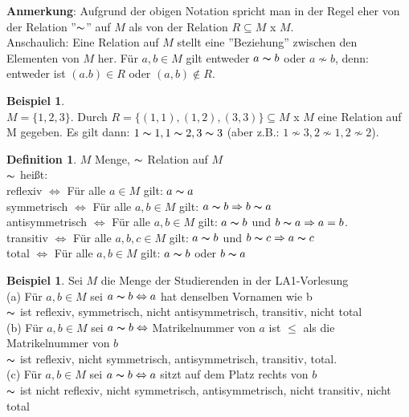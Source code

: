 \documentclass[10pt,a4paper,numbers=endperiod]{scrartcl}
\theoremstyle{definition}
\newtheorem{defi}[satz]{Definition}
\newtheorem{bsp}[satz]{Beispiel}
\begin{document}
\textbf{Anmerkung}: Aufgrund der obigen Notation spricht man in der Regel eher von der Relation ''$\thicksim$'' auf $M$ als von der Relation $R \subseteq M$ x $M$.\\
Anschaulich: Eine Relation auf $M$ stellt eine ''Beziehung'' zwischen den Elementen von $M$ her. Für $a,b \in M$ gilt entweder $a \thicksim b$ oder $a \nsim b$, denn: entweder ist $(a.b) \in R$ oder $(a,b) \notin R$.

\begin{bsp}
	$ $ \\$M=\{1,2,3\}$. Durch $R = \{(1,1),(1,2),(3,3)\} \subseteq M$ x $M$ eine Relation auf M gegeben. Es gilt dann: $1 \thicksim 1, 1 \thicksim 2, 3 \thicksim 3$ (aber z.B.: $1 \nsim 3, 2 \nsim 1, 2 \nsim 2$). 
\end{bsp}

\begin{defi}
	$M$ Menge, $\thicksim$ Relation auf $M$\\
	$\thicksim$ heißt:\\
	 reflexiv $\Leftrightarrow$ Für alle $a \in M$ gilt: $a \thicksim a$\\
	 symmetrisch $\Leftrightarrow$ Für alle $a,b \in M$ gilt: $a \thicksim b \Rightarrow b \thicksim a$\\
	 antisymmetrisch $\Leftrightarrow$ Für alle $a,b \in M$ gilt: $a \thicksim b$ und $b \thicksim a \Rightarrow a = b$.\\
	 transitiv $\Leftrightarrow$ Für alle $a,b,c \in M$ gilt: $a \thicksim b$ und $b \thicksim c \Rightarrow a \thicksim c$\\
	 total $\Leftrightarrow$ Für alle $a,b \in M$ gilt: $a \thicksim b$ oder $b \thicksim a$				    
\end{defi}

\begin{bsp}
	Sei $M$ die Menge der Studierenden in der LA1-Vorlesung\\
	(a) Für $a,b \in M$ sei $a \thicksim b \Leftrightarrow a$ hat denselben Vornamen wie b\\
	$\thicksim$ ist reflexiv, symmetrisch, nicht antisymmetrisch, transitiv, nicht total\\
	(b) Für $a,b \in M$ sei $a \thicksim b \Leftrightarrow$ Matrikelnummer von $a$ ist $\leq$ als die Matrikelnummer von $b$\\
	$\thicksim$ ist reflexiv, nicht symmetrisch, antisymmetrisch, transitiv, total.\\
	(c) Für $a,b \in M$ sei $a \thicksim b \Leftrightarrow a$ sitzt auf dem Platz rechts von $b$\\
	$\thicksim$ ist nicht reflexiv, nicht symmetrisch, antisymmetrisch, nicht transitiv, nicht total
\end{bsp}
\end{document}
